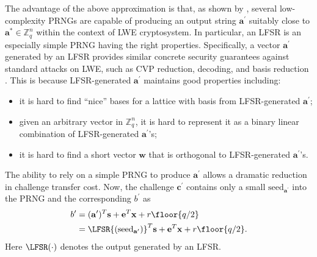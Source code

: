 The advantage of the above approximation is that, as shown by \cite{galbraith2013space}, several low-complexity  PRNGs are capable of producing an output string $\mathbf{a}^\prime$ suitably close to $\mathbf{a^*}\in\mathbb{Z}^n_q$ within the context of LWE cryptosystem. In particular, an LFSR is an especially simple PRNG having the right properties.
Specifically, a vector $\mathbf{a}^\prime$ generated by an LFSR provides similar concrete security guarantees against standard attacks on LWE, such as CVP reduction, decoding, and basis reduction \cite{galbraith2013space}.
This is because LFSR-generated $\mathbf{a}^\prime$ maintains good properties including:
\begin{itemize}
    \item it is hard to find ``nice'' bases for a lattice with basis from LFSR-generated $\mathbf{a}^\prime$;
    \item given an arbitrary vector in $\mathbb{Z}_q^n$, it is hard to represent it as a binary linear combination of LFSR-generated $\mathbf{a}^\prime$'s;
    \item it is hard to find a short vector $\mathbf{w}$ that is orthogonal to LFSR-generated $\mathbf{a}^\prime$'s.
\end{itemize}

The ability to rely on a simple PRNG to produce $\mathbf{a}^\prime$ allows a dramatic reduction in challenge transfer cost. 
Now, the challenge $\mathbf{c}^\prime$ contains only a small $\text{seed}_{\mathbf{a}^\prime}$ into the PRNG and the corresponding $b^\prime$ as
\begin{align*}
    b^\prime&=(\mathbf{a}^\prime)^T\mathbf{s}+\mathbf{e}^T\mathbf{x}+r\floor{q/2}\\
    &= \LFSR{(\text{seed}_{\mathbf{a}^\prime})}^T\mathbf{s}+\mathbf{e}^T\mathbf{x}+r\floor{q/2}.
\end{align*}
Here $\LFSR(\cdot)$ denotes the output generated by an LFSR.




